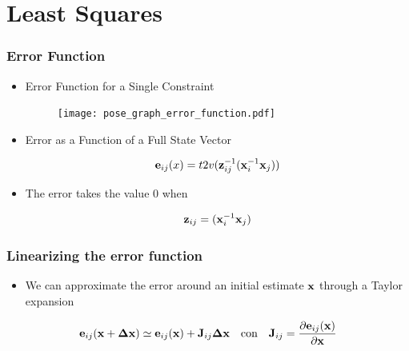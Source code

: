     \section{Least Squares}
    
    
    \begin{frame}
    \frametitle{Error Function}
    
    \begin{itemize}
    \item Error Function for a Single Constraint
    \begin{figure}
    \texttt{[image: pose\_graph\_error\_function.pdf]}
    \end{figure}
    
    \item Error as a Function of a Full State Vector
    
    \begin{equation*}
    \boldsymbol{\mathbf{e}}_{ij}(x) = t2v({\boldsymbol{\mathbf{z}}}^{-1}_{ij}({\boldsymbol{\mathbf{x}}}^{-1}_{i}\boldsymbol{\mathbf{x}}_{j}))
    \end{equation*}
    
    \item The error takes the value 0 when
    
    \begin{equation*}
    \boldsymbol{\mathbf{z}}_{ij} = ({\boldsymbol{\mathbf{x}}}^{-1}_{i}\boldsymbol{\mathbf{x}}_{j})
    \end{equation*}
    
    \end{itemize}
    \end{frame}
    
    \begin{frame}
    \frametitle{Linearizing the error function}
    
    \begin{itemize}
    \item We can approximate the error around an initial estimate $\boldsymbol{\mathbf{x}}$ through a Taylor expansion
    \end{itemize}
    
    \begin{equation*}
    \boldsymbol{\mathbf{e}}_{ij}(\boldsymbol{\mathbf{x}} + \boldsymbol{\mathbf{\Delta}}\boldsymbol{\mathbf{x}}) \simeq \boldsymbol{\mathbf{e}}_{ij}(\boldsymbol{\mathbf{x}}) + \boldsymbol{\mathbf{J}}_{ij}\boldsymbol{\mathbf{\Delta}}\boldsymbol{\mathbf{x}} \quad \text{con} \quad \boldsymbol{\mathbf{J}}_{ij} = \dfrac{\partial\boldsymbol{\mathbf{e}}_{ij}(\boldsymbol{\mathbf{x}})}{\partial\boldsymbol{\mathbf{x}}}
    \end{equation*}
    
    \end{frame}
    
